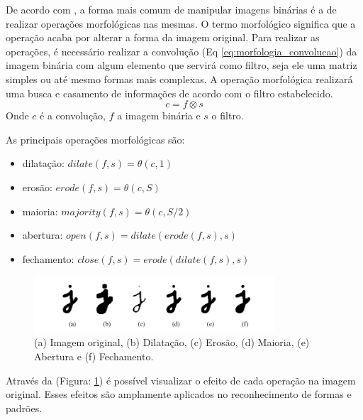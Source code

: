 De acordo com , a forma mais comum de manipular imagens binárias é a de realizar operações morfológicas nas mesmas. O termo morfológico significa que a operação acaba por alterar a forma da imagem original. Para realizar as operações, é necessário realizar a convolução (Eq \ref{eq:morfologia_convolucao}) da imagem binária com algum elemento que servirá como filtro, seja ele uma matriz simples ou até mesmo formas mais complexas. A operação morfológica realizará uma busca e casamento de informações de acordo com o filtro estabelecido. \cite{szeliski2021computer}
\begin{equation}
    c = f \otimes s
    \label{eq:morfologia_convolucao}
\end{equation}
Onde $c$ é a convolução, $f$ a imagem binária e $s$ o filtro.
\par
As principais operações morfológicas são:
\begin{itemize}
    \item dilatação: $dilate(f,s) = \theta(c,1)$
    \item erosão: $erode(f,s) = \theta(c,S)$
    \item maioria: $majority(f,s) = \theta(c,S/2)$
    \item abertura: $open(f,s) = dilate(erode(f,s),s)$
    \item fechamento: $close(f,s) = erode(dilate(f,s),s)$
\end{itemize}
\begin{figure}[ht]
    \centering
    \includegraphics[width=0.8\textwidth]{capitulos/operacoes_morfologicas.png}
    \caption{(a) Imagem original, (b) Dilatação, (c) Erosão, (d) Maioria, (e) Abertura e (f) Fechamento. \cite{szeliski2021computer}}
    \label{fig:operacoes_morfologicas}
\end{figure}
Através da (Figura: \ref{fig:operacoes_morfologicas}) é possível visualizar o efeito de cada operação na imagem original. Esses efeitos são amplamente aplicados no reconhecimento de formas e padrões. 
